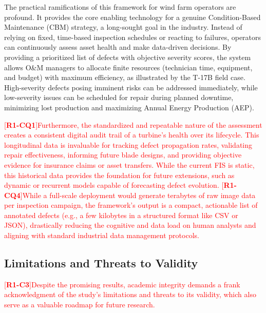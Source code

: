 \documentclass[energies,article,submit,pdftex,moreauthors]{Definitions/mdpi}
\newcommand{\revtag}[2]{[\textbf{R#1-C#2}]}
\newcommand{\Rone}[1]{\textcolor{red}{#1}}
\begin{document}
The practical ramifications of this framework for wind farm operators are profound. It provides the core enabling technology for a genuine Condition-Based Maintenance (CBM) strategy, a long-sought goal in the industry. Instead of relying on fixed, time-based inspection schedules or reacting to failures, operators can continuously assess asset health and make data-driven decisions. By providing a prioritized list of defects with objective severity scores, the system allows O\&M managers to allocate finite resources (technician time, equipment, and budget) with maximum efficiency, as illustrated by the T-17B field case. High-severity defects posing imminent risks can be addressed immediately, while low-severity issues can be scheduled for repair during planned downtime, minimizing lost production and maximizing Annual Energy Production (AEP).

\Rone{\revtag{1}{Q1}Furthermore, the standardized and repeatable nature of the assessment creates a consistent digital audit trail of a turbine's health over its lifecycle. This longitudinal data is invaluable for tracking defect propagation rates, validating repair effectiveness, informing future blade designs, and providing objective evidence for insurance claims or asset transfers. While the current FIS is static, this historical data provides the foundation for future extensions, such as dynamic or recurrent models capable of forecasting defect evolution.} \Rone{\revtag{1}{Q4}While a full-scale deployment would generate terabytes of raw image data per inspection campaign, the framework's output is a compact, actionable list of annotated defects (e.g., a few kilobytes in a structured format like CSV or JSON), drastically reducing the cognitive and data load on human analysts and aligning with standard industrial data management protocols.}

\subsection{Limitations and Threats to Validity}
\Rone{\revtag{1}{3}Despite the promising results, academic integrity demands a frank acknowledgment of the study's limitations and threats to its validity, which also serve as a valuable roadmap for future research.}
\end{document}
